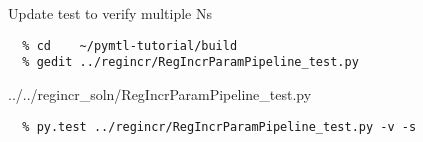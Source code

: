 \begin{task}\begin{frame}[fragile]{Update test to verify multiple Ns}
\vspace{-0.25in}
\begin{verbatim}
  % cd    ~/pymtl-tutorial/build
  % gedit ../regincr/RegIncrParamPipeline_test.py
\end{verbatim}

\vspace{-0.3in}
%
{../../regincr_soln/RegIncrParamPipeline_test.py}

\vspace{-0.3in}
\begin{verbatim}
  % py.test ../regincr/RegIncrParamPipeline_test.py -v -s
\end{verbatim}
\end{frame}
\end{task}

